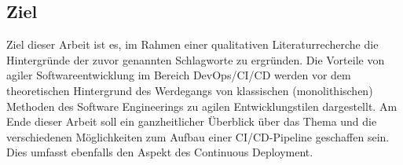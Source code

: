 \subsection{Ziel}
\label{Ziel}
Ziel dieser Arbeit ist es, im Rahmen einer qualitativen Literaturrecherche die Hintergründe der
zuvor genannten Schlagworte zu ergründen. Die Vorteile von agiler Softwareentwicklung im Bereich \gls{DevOps}/\acrshort{CI}/\acrshort{CD} werden vor dem theoretischen Hintergrund des Werdegangs von klassischen (monolithischen) Methoden des Software Engineerings zu agilen Entwicklungstilen dargestellt.
Am Ende dieser Arbeit soll ein ganzheitlicher Überblick über das Thema und die verschiedenen Möglichkeiten zum Aufbau einer \acrshort{CI}/\acrshort{CD}-Pipeline geschaffen sein.  Dies umfasst ebenfalls den Aspekt des Continuous Deployment.